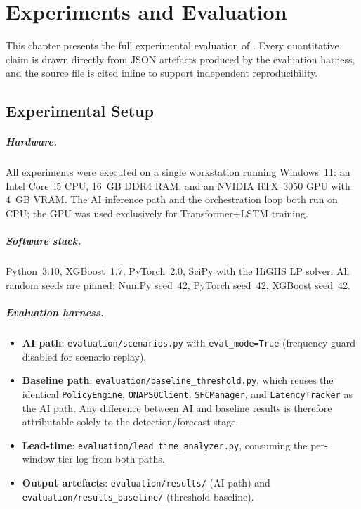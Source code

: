 \chapter{Experiments and Evaluation}
\label{ch:eval}

This chapter presents the full experimental evaluation of \padonap{}.
Every quantitative claim is drawn directly from JSON artefacts produced
by the evaluation harness, and the source file is cited inline to
support independent reproducibility.

\section{Experimental Setup}
\label{sec:setup}

\paragraph{Hardware.}
All experiments were executed on a single workstation running Windows~11:
an Intel Core~i5 CPU, 16~GB DDR4 RAM, and an NVIDIA RTX~3050 GPU with
4~GB VRAM. The AI inference path and the orchestration loop both run on
CPU; the GPU was used exclusively for Transformer+LSTM training.

\paragraph{Software stack.}
Python~3.10, XGBoost~1.7, PyTorch~2.0, SciPy with the HiGHS LP solver.
All random seeds are pinned: NumPy seed~42, PyTorch seed~42,
XGBoost seed~42.

\paragraph{Evaluation harness.}
\begin{itemize}
  \item \textbf{AI path}: \texttt{evaluation/scenarios.py} with
        \texttt{eval\_mode=True} (frequency guard disabled for scenario
        replay).
  \item \textbf{Baseline path}: \texttt{evaluation/baseline\_threshold.py},
        which reuses the identical \texttt{PolicyEngine},
        \texttt{ONAPSOClient}, \texttt{SFCManager}, and
        \texttt{LatencyTracker} as the AI path. Any difference between
        AI and baseline results is therefore attributable solely to the
        detection/forecast stage.
  \item \textbf{Lead-time}: \texttt{evaluation/lead\_time\_analyzer.py},
        consuming the per-window tier log from both paths.
  \item \textbf{Output artefacts}: \texttt{evaluation/results/} (AI path)
        and \texttt{evaluation/results\_baseline/} (threshold baseline).
\end{itemize}

